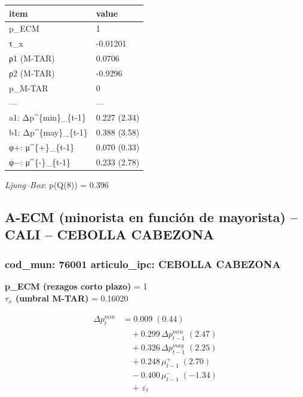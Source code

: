 \documentclass[
  12pt,
]{article}
\begin{document}
\begin{longtable}[t]{ll}
\toprule
item & value\\
\midrule
p\_ECM & 1\\
τ\_x & -0.01201\\
ρ1 (M-TAR) & 0.0706\\
ρ2 (M-TAR) & -0.9296\\
p\_M-TAR & 0\\
\addlinespace
— & —\\
a1: Δp\textasciicircum{}\{min\}\_\{t-1\} & 0.227 (2.34)\\
b1: Δp\textasciicircum{}\{may\}\_\{t-1\} & 0.388 (3.58)\\
φ+: μ\textasciicircum{}\{+\}\_\{t-1\} & 0.070 (0.33)\\
φ−: μ\textasciicircum{}\{-\}\_\{t-1\} & 0.233 (2.78)\\
\bottomrule
\end{longtable}

\emph{Ljung--Box}: p(Q(8)) = 0.396

\subsection{A-ECM (minorista en función de mayorista) -- CALI -- CEBOLLA
CABEZONA}\label{a-ecm-minorista-en-funciuxf3n-de-mayorista-cali-cebolla-cabezona}

\subsubsection{cod\_mun: 76001 \textbar{} articulo\_ipc: CEBOLLA
CABEZONA}\label{cod_mun-76001-articulo_ipc-cebolla-cabezona}

\textbf{p\_ECM (rezagos corto plazo)} = 1\\
\textbf{\(\tau_x\) (umbral M-TAR)} = 0.16020

\[
\begin{aligned}
\Delta p^{min}_{t} &= 0.009\;(0.44) \\
&\quad + 0.299\,\Delta p^{min}_{t-1}\;(2.47) \\
&\quad + 0.326\,\Delta p^{may}_{t-1}\;(2.25) \\
&\quad + 0.248\,\mu^{+}_{t-1}\;(2.70) \\
&\quad − 0.400\,\mu^{-}_{t-1}\;(-1.34) \\
&\quad +\, \varepsilon_t
\end{aligned}
\]
\end{document}

